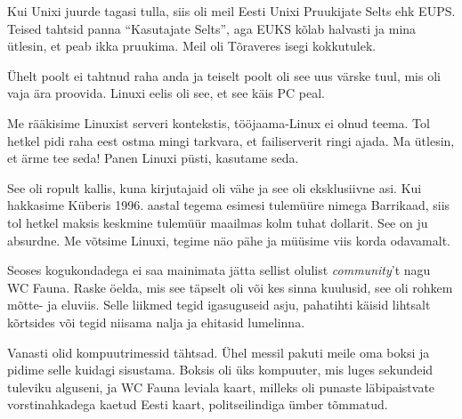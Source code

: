 Kui Unixi juurde tagasi tulla, siis oli meil 
Eesti Unixi Pruukijate Selts ehk EUPS. Teised tahtsid panna \enquote{Kasutajate Selts}, aga EUKS kõlab 
halvasti ja mina ütlesin, et peab ikka pruukima. Meil oli 
Tõraveres isegi kokkutulek.


Ühelt poolt ei tahtnud raha anda ja teiselt poolt oli see uus värske 
tuul, mis oli vaja ära proovida. Linuxi eelis oli see, et see käis 
PC peal. 


Me rääkisime Linuxist serveri kontekstis, tööjaama-Linux ei olnud teema. 
Tol hetkel pidi raha eest ostma mingi tarkvara, et failiserverit ringi 
ajada. Ma ütlesin, et ärme tee seda! Panen Linuxi püsti, kasutame 
seda. 


See oli ropult kallis, kuna kirjutajaid oli vähe ja see oli eksklusiivne asi. Kui hakkasime Küberis 1996. aastal tegema esimesi tulemüüre nimega 
Barrikaad, siis tol hetkel maksis keskmine tulemüür maailmas 
kolm tuhat dollarit. See on ju absurdne. Me võtsime Linuxi, tegime näo pähe ja 
müüsime viis korda odavamalt.

Seoses kogukondadega ei saa mainimata jätta 
sellist olulist \emph{community}'t nagu WC Fauna. 
Raske öelda, mis see täpselt oli või kes sinna kuulusid, see oli rohkem 
mõtte- ja eluviis. Selle liikmed tegid igasuguseid asju, pahatihti käisid 
lihtsalt kõrtsides või tegid niisama nalja ja ehitasid lumelinna.

Vanasti olid kompuutrimessid tähtsad. Ühel messil pakuti meile oma boksi ja pidime selle 
kuidagi sisustama. Boksis oli üks kompuuter, mis luges sekundeid tuleviku 
alguseni, ja WC Fauna leviala kaart, milleks oli punaste läbipaistvate 
vorstinahkadega kaetud Eesti kaart, politseilindiga ümber tõmmatud. 

